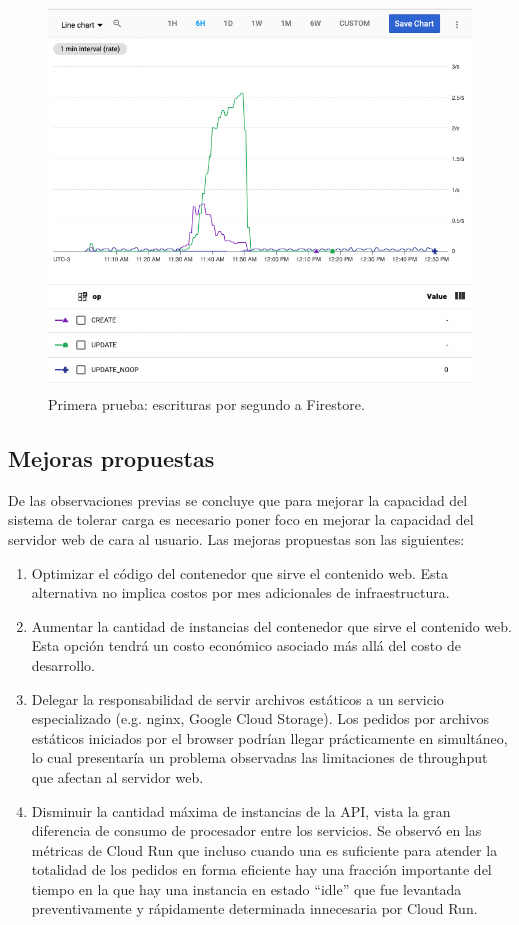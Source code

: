 \documentclass[11pt]{scrartcl}
\begin{document}
\begin{figure}
\centering
\includegraphics[scale=0.4]{img/firestore}
\caption{Primera prueba: escrituras por segundo a Firestore.}
\label{fig:test-1-firestore}
\end{figure}

\subsection{Mejoras propuestas}\label{sec:improvements}

De las observaciones previas se concluye que para mejorar la capacidad del sistema de tolerar carga es necesario poner foco en mejorar la capacidad del servidor web de cara al usuario. Las mejoras propuestas son las siguientes:

\begin{enumerate}
\item Optimizar el código del contenedor que sirve el contenido web. Esta alternativa no implica costos por mes adicionales de infraestructura.
\item Aumentar la cantidad de instancias del contenedor que sirve el contenido web. Esta opción tendrá un costo económico asociado más allá del costo de desarrollo.
\item Delegar la responsabilidad de servir archivos estáticos a un servicio especializado (e.g. nginx, Google Cloud Storage). Los pedidos por archivos estáticos iniciados por el browser podrían llegar prácticamente en simultáneo, lo cual presentaría un problema observadas las limitaciones de throughput que afectan al servidor web.
\item Disminuir la cantidad máxima de instancias de la API, vista la gran diferencia de consumo de procesador entre los servicios. Se observó en las métricas de Cloud Run que incluso cuando una es suficiente para atender la totalidad de los pedidos en forma eficiente hay una fracción importante del tiempo en la que hay una instancia en estado ``idle''  que fue levantada preventivamente y rápidamente determinada innecesaria por Cloud Run.
\end{enumerate}
\end{document}
